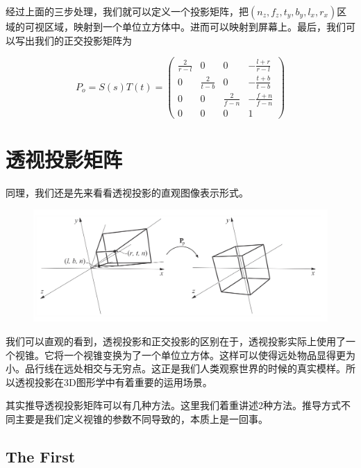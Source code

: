 \documentclass{article} \usepackage{braket} \usepackage{amsmath,amssymb} \usepackage{geometry} \usepackage{graphicx} \usepackage{braket} \usepackage{bm}\usepackage{hyperref} \usepackage{CJKutf8}
\begin{document}
\begin{CJK}{UTF8}{gbsn}
  经过上面的三步处理，我们就可以定义一个投影矩阵，把$(n_z,f_z,t_y,b_y,l_x,r_x)$区域的可视区域，映射到一个单位立方体中。进而可以映射到屏幕上。最后，我们可以写出我们的正交投影矩阵为

  \begin{displaymath}
    P_o=S(s)T(t)=\left(
      \begin{array}{cccc}
        \frac{2}{r-l} & 0 & 0 & -\frac{l+r}{r-l} \\
        0 & \frac{2}{t-b} & 0 & -\frac{t+b}{t-b} \\
        0 & 0 & \frac{2}{f-n} & -\frac{f+n}{f-n} \\
        0 & 0 & 0 & 1 
      \end{array}
    \right)
  \end{displaymath}

  \section{透视投影矩阵}

  同理，我们还是先来看看透视投影的直观图像表示形式。

  \begin{figure}[htbp]
    \centering
    \includegraphics[width=1.0\linewidth]{pic-3.jpg}
  \end{figure}	

  我们可以直观的看到，透视投影和正交投影的区别在于，透视投影实际上使用了一个视锥。它将一个视锥变换为了一个单位立方体。这样可以使得远处物品显得更为小。品行线在远处相交与无穷点。这正是我们人类观察世界的时候的真实模样。所以透视投影在3D图形学中有着重要的运用场景。

  其实推导透视投影矩阵可以有几种方法。这里我们着重讲述$2$种方法。推导方式不同主要是我们定义视锥的参数不同导致的，本质上是一回事。

  \subsection{The First}


\end{CJK}
\end{document}

